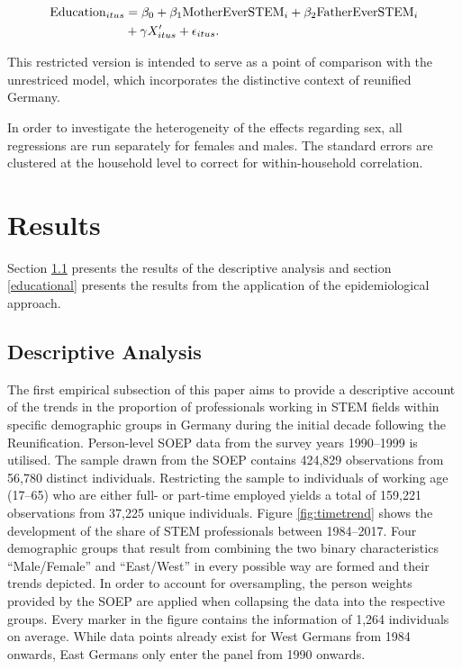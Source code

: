 \documentclass[a4paper, oneside, hyperfootnotes = false]{article}
\begin{document}
{\vspace{-8mm}

\begin{equation}
	\begin{split}
		\label{eq:specificationrestr}
		\textnormal{Education}_{itus} &={} \beta_{0} + \beta_{1}\textnormal{MotherEverSTEM}_{i} + \beta_{2}\textnormal{FatherEverSTEM}_{i} \\
		& + \gamma{}X'_{itus} + \epsilon_{itus}\textnormal{.}
	\end{split}
\end{equation}

This restricted version is intended to serve as a point of comparison with the unrestriced model, which incorporates the distinctive context of reunified Germany.

In order to investigate the heterogeneity of the effects regarding sex, all regressions are run separately for females and males.
The standard errors are clustered at the household level to correct for within-household correlation.

\section{Results}
\label{results}

Section \ref{descriptives} presents the results of the descriptive analysis and section \ref{educational} presents the results from the application of the epidemiological approach.

\subsection{Descriptive Analysis}
\label{descriptives}

The first empirical subsection of this paper aims to provide a descriptive account of the trends in the proportion of professionals working in STEM fields within specific demographic groups in Germany during the initial decade following the Reunification.
Person-level SOEP data from the survey years 1990--1999 is utilised.
The sample drawn from the SOEP contains 424,829 observations from 56,780 distinct individuals.
Restricting the sample to individuals of working age (17--65) who are either full- or part-time employed yields a total of 159,221 observations from 37,225 unique individuals.
Figure \ref{fig:timetrend} shows the development of the share of STEM professionals between 1984--2017.
Four demographic groups that result from combining the two binary characteristics ``Male/Female'' and ``East/West'' in every possible way are formed and their trends depicted.
In order to account for oversampling, the person weights provided by the SOEP are applied when collapsing the data into the respective groups.
Every marker in the figure contains the information of 1,264 individuals on average.
While data points already exist for West Germans from 1984 onwards, East Germans only enter the panel from 1990 onwards.

}
\end{document}
